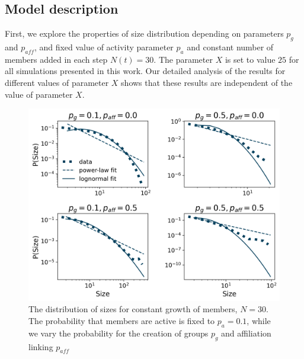 \subsection{Model description}
First, we explore the properties of size distribution depending on parameters $p_{g}$ and $p_{aff}$, and fixed value of activity parameter $p_{a}$ and constant number of members added in each step $N(t)=30$. The parameter $X$ is set to value $25$ for all simulations presented in this work. Our detailed analysis of the results for different values of parameter $X$ shows that these results are independent of the value of parameter $X$.

\begin{figure}
	\centering
	\includegraphics[scale=0.8]{Figures/figures/Fig5.png}
	\caption{The distribution of sizes for constant growth of members, $N=30$. The probability that members are active is fixed to $p_a = 0.1$, while we vary the probability for the creation of groups $p_g$ and affiliation linking $p_{aff}$}
	\label{fig:n30}
\end{figure}

